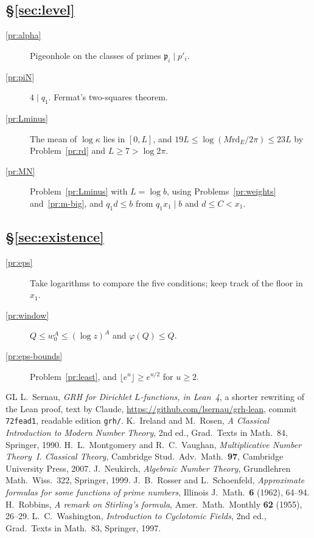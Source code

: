 \documentclass[reqno]{amsart}
\theoremstyle{plain}
\theoremstyle{definition}
\newcommand{\rd}{\mathrm{rd}}
\begin{document}
\subsection*{\S\ref{sec:level}}
\begin{description}
\item[\ref{pr:alpha}] Pigeonhole on the classes of primes \(\mathfrak p_i \mid p'_i\).
\item[\ref{pr:piN}] \(4 \mid q_1\).  Fermat's two-squares theorem.
\item[\ref{pr:Lminus}] The mean of \(\log\kappa\) lies in \([0, L]\), and \(19L \le \log(M\rd_E/2\pi) \le 23L\) by Problem~\ref{pr:rd} and \(L \ge 7 > \log 2\pi\).
\item[\ref{pr:MN}] Problem~\ref{pr:Lminus} with \(L = \log b\), using Problems~\ref{pr:weights} and~\ref{pr:m-big}, and \(q_1 d \le b\) from \(q_1 x_1 \mid b\) and \(d \le C < x_1\).
\end{description}

\subsection*{\S\ref{sec:existence}}
\begin{description}
\item[\ref{pr:eps}] Take logarithms to compare the five conditions; keep track of the floor in \(x_1\).
\item[\ref{pr:window}] \(Q \le w_0^A \le (\log z)^A\) and \(\varphi(Q) \le Q\).
\item[\ref{pr:eps-bounds}] Problem~\ref{pr:least}, and \(\lfloor e^u \rfloor \ge e^{u/2}\) for \(u \ge 2\).
\end{description}

{\small
\begin{thebibliography}{GL}
 L.~Sernau, \emph{GRH for Dirichlet \(L\)-functions, in Lean~4}, a shorter rewriting of the Lean proof, text by Claude, \url{https://github.com/lsernau/grh-lean}, commit \texttt{72fead1}, readable edition \texttt{grh/}.
 K.~Ireland and M.~Rosen, \emph{A Classical Introduction to Modern Number Theory}, 2nd ed., Grad.\ Texts in Math.\ 84, Springer, 1990.
 H.~L.~Montgomery and R.~C.~Vaughan, \emph{Multiplicative Number Theory~I. Classical Theory}, Cambridge Stud.\ Adv.\ Math.\ \textbf{97}, Cambridge University Press, 2007.
 J.~Neukirch, \emph{Algebraic Number Theory}, Grundlehren Math.\ Wiss.\ 322, Springer, 1999.
 J.~B.~Rosser and L.~Schoenfeld, \emph{Approximate formulas for some functions of prime numbers}, Illinois J.~Math.\ \textbf{6} (1962), 64--94.
 H.~Robbins, \emph{A remark on Stirling's formula}, Amer.\ Math.\ Monthly \textbf{62} (1955), 26--29.
 L.~C.~Washington, \emph{Introduction to Cyclotomic Fields}, 2nd ed., Grad.\ Texts in Math.\ 83, Springer, 1997.
\end{thebibliography}
}
\end{document}
